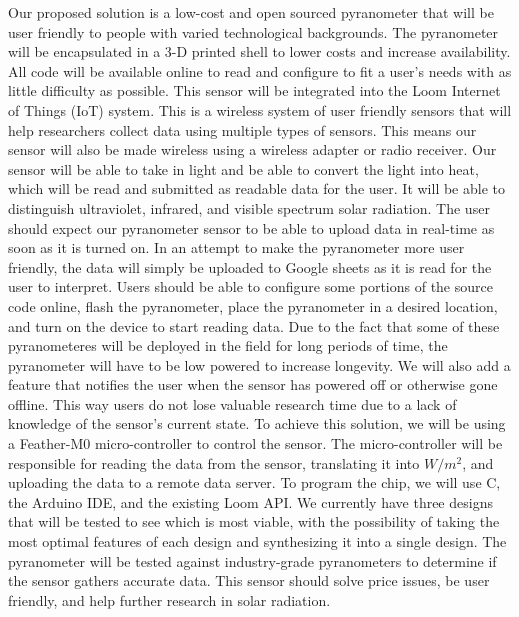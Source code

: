 \documentclass[10pt,draftclsnofoot,onecolumn,letterpaper]{article}
\begin{document}
{\fontsize{10pt}{12.0pt}\selectfont Our proposed solution is a low-cost and open sourced pyranometer that will be user friendly to people with varied technological backgrounds. The pyranometer will be encapsulated in a 3-D printed shell to lower costs and increase availability. All code will be available online to read and configure to fit a user's needs with as little difficulty as possible. This sensor will be integrated into the Loom Internet of Things (IoT) system. This is a wireless system of user friendly sensors that will help researchers collect data using multiple types of sensors. This means our sensor will also be made wireless using a wireless adapter or radio receiver. Our sensor will be able to take in light and be able to convert the light into heat, which will be read and submitted as readable data for the user. It will be able to distinguish ultraviolet, infrared, and visible spectrum solar radiation. The user should expect our pyranometer sensor to be able to upload data in real-time as soon as it is turned on. In an attempt to make the pyranometer more user friendly, the data will simply be uploaded to Google sheets as it is read for the user to interpret. Users should be able to configure some portions of the source code online, flash the pyranometer, place the pyranometer in a desired location, and turn on the device to start reading data. Due to the fact that some of these pyranometeres will be deployed in the field for long periods of time, the pyranometer will have to be low powered to increase longevity. We will also add a feature that notifies the user when the sensor has powered off or otherwise gone offline. This way users do not lose valuable research time due to a lack of knowledge of the sensor's current state. To achieve this solution, we will be using a Feather-M0 micro-controller to control the sensor. The micro-controller will be responsible for reading the data from the sensor, translating it into $W/m^2$, and uploading the data to a remote data server. To program the chip, we will use C, the Arduino IDE, and the existing Loom API. We currently have three designs that will be tested to see which is most viable, with the possibility of taking the most optimal features of each design and synthesizing it into a single design. The pyranometer will be tested against industry-grade pyranometers to determine if the sensor gathers accurate data. This sensor should solve price issues, be user friendly, and help further research in solar radiation. \par}\par
\end{document}
